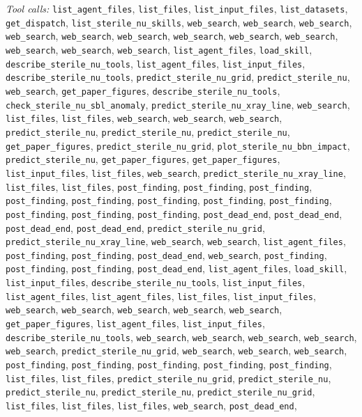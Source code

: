 \documentclass[11pt,a4paper]{article}
\begin{document}
\textit{Tool calls:} \texttt{list\_agent\_files}, \texttt{list\_files}, \texttt{list\_input\_files}, \texttt{list\_datasets}, \texttt{get\_dispatch}, \texttt{list\_sterile\_nu\_skills}, \texttt{web\_search}, \texttt{web\_search}, \texttt{web\_search}, \texttt{web\_search}, \texttt{web\_search}, \texttt{web\_search}, \texttt{web\_search}, \texttt{web\_search}, \texttt{web\_search}, \texttt{web\_search}, \texttt{web\_search}, \texttt{web\_search}, \texttt{list\_agent\_files}, \texttt{load\_skill}, \texttt{describe\_sterile\_nu\_tools}, \texttt{list\_agent\_files}, \texttt{list\_input\_files}, \texttt{describe\_sterile\_nu\_tools}, \texttt{predict\_sterile\_nu\_grid}, \texttt{predict\_sterile\_nu}, \texttt{web\_search}, \texttt{get\_paper\_figures}, \texttt{describe\_sterile\_nu\_tools}, \texttt{check\_sterile\_nu\_sbl\_anomaly}, \texttt{predict\_sterile\_nu\_xray\_line}, \texttt{web\_search}, \texttt{list\_files}, \texttt{list\_files}, \texttt{web\_search}, \texttt{web\_search}, \texttt{web\_search}, \texttt{predict\_sterile\_nu}, \texttt{predict\_sterile\_nu}, \texttt{predict\_sterile\_nu}, \texttt{get\_paper\_figures}, \texttt{predict\_sterile\_nu\_grid}, \texttt{plot\_sterile\_nu\_bbn\_impact}, \texttt{predict\_sterile\_nu}, \texttt{get\_paper\_figures}, \texttt{get\_paper\_figures}, \texttt{list\_input\_files}, \texttt{list\_files}, \texttt{web\_search}, \texttt{predict\_sterile\_nu\_xray\_line}, \texttt{list\_files}, \texttt{list\_files}, \texttt{post\_finding}, \texttt{post\_finding}, \texttt{post\_finding}, \texttt{post\_finding}, \texttt{post\_finding}, \texttt{post\_finding}, \texttt{post\_finding}, \texttt{post\_finding}, \texttt{post\_finding}, \texttt{post\_finding}, \texttt{post\_finding}, \texttt{post\_dead\_end}, \texttt{post\_dead\_end}, \texttt{post\_dead\_end}, \texttt{post\_dead\_end}, \texttt{predict\_sterile\_nu\_grid}, \texttt{predict\_sterile\_nu\_xray\_line}, \texttt{web\_search}, \texttt{web\_search}, \texttt{list\_agent\_files}, \texttt{post\_finding}, \texttt{post\_finding}, \texttt{post\_dead\_end}, \texttt{web\_search}, \texttt{post\_finding}, \texttt{post\_finding}, \texttt{post\_finding}, \texttt{post\_dead\_end}, \texttt{list\_agent\_files}, \texttt{load\_skill}, \texttt{list\_input\_files}, \texttt{describe\_sterile\_nu\_tools}, \texttt{list\_input\_files}, \texttt{list\_agent\_files}, \texttt{list\_agent\_files}, \texttt{list\_files}, \texttt{list\_input\_files}, \texttt{web\_search}, \texttt{web\_search}, \texttt{web\_search}, \texttt{web\_search}, \texttt{web\_search}, \texttt{get\_paper\_figures}, \texttt{list\_agent\_files}, \texttt{list\_input\_files}, \texttt{describe\_sterile\_nu\_tools}, \texttt{web\_search}, \texttt{web\_search}, \texttt{web\_search}, \texttt{web\_search}, \texttt{web\_search}, \texttt{predict\_sterile\_nu\_grid}, \texttt{web\_search}, \texttt{web\_search}, \texttt{web\_search}, \texttt{post\_finding}, \texttt{post\_finding}, \texttt{post\_finding}, \texttt{post\_finding}, \texttt{post\_finding}, \texttt{list\_files}, \texttt{list\_files}, \texttt{predict\_sterile\_nu\_grid}, \texttt{predict\_sterile\_nu}, \texttt{predict\_sterile\_nu}, \texttt{predict\_sterile\_nu}, \texttt{predict\_sterile\_nu\_grid}, \texttt{list\_files}, \texttt{list\_files}, \texttt{list\_files}, \texttt{web\_search}, \texttt{post\_dead\_end}, 
\end{document}
